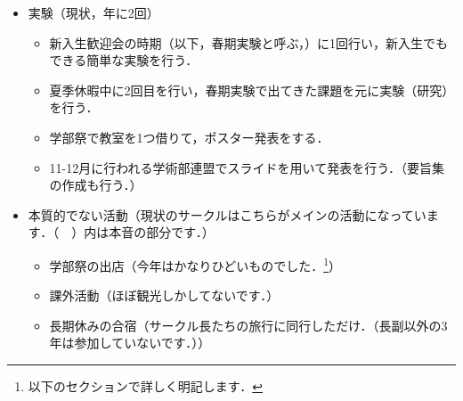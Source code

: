 \documentclass[a4paper,11pt,titlepage]{ltjsarticle}
\begin{document}
\begin{itemize}
    \item 実験（現状，年に2回）
    \begin{itemize}
        \item 新入生歓迎会の時期（以下，春期実験と呼ぶ，）に1回行い，新入生でもできる簡単な実験を行う．
        \item 夏季休暇中に2回目を行い，春期実験で出てきた課題を元に実験（研究）を行う．
        \item 学部祭で教室を1つ借りて，ポスター発表をする．
        \item 11-12月に行われる学術部連盟でスライドを用いて発表を行う．（要旨集の作成も行う．）
    \end{itemize}
    \item 本質的でない活動（現状のサークルはこちらがメインの活動になっています．（　）内は本音の部分です．）
    \begin{itemize}
        \item 学部祭の出店（今年はかなりひどいものでした．\footnote{以下のセクションで詳しく明記します．}）
        \item 課外活動（ほぼ観光しかしてないです．）
        \item 長期休みの合宿（サークル長たちの旅行に同行しただけ．（長副以外の3年は参加していないです．））
    \end{itemize}
\end{itemize}
\end{document}
